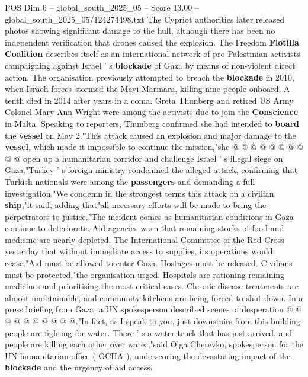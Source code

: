 \begin{textsample}{POS Dim 6 – global\_south\_2025\_05 – Score 13.00 – global\_south\_2025\_05/124274498.txt}
The Cypriot authorities later released photos showing significant damage to the hull, although there has been no independent verification that drones caused the explosion.
The Freedom \textbf{Flotilla} \textbf{Coalition} describes itself as an international network of pro-Palestinian activists campaigning against Israel ' s \textbf{blockade} of Gaza by means of non-violent direct action.
The organisation previously attempted to breach the \textbf{blockade} in 2010, when Israeli forces stormed the Mavi Marmara, killing nine people onboard.
A tenth died in 2014 after years in a coma.
Greta Thunberg and retired US Army Colonel Mary Ann Wright were among the activists due to join the \textbf{Conscience} in Malta.
Speaking to reporters, Thunberg confirmed she had intended to \textbf{board} the \textbf{vessel} on May 2."This attack caused an explosion and major damage to the \textbf{vessel}, which made it impossible to continue the mission,"she @ @ @ @ @ @ @ @ @ @ open up a humanitarian corridor and challenge Israel ' s illegal siege on Gaza."Turkey ' s foreign ministry condemned the alleged attack, confirming that Turkish nationals were among the \textbf{passengers} and demanding a full investigation."We condemn in the strongest terms this attack on a civilian \textbf{ship},"it said, adding that"all necessary efforts will be made to bring the perpetrators to justice."The incident comes as humanitarian conditions in Gaza continue to deteriorate.
Aid agencies warn that remaining stocks of food and medicine are nearly depleted.
The International Committee of the Red Cross yesterday that without immediate access to supplies, its operations would cease."Aid must be allowed to enter Gaza.
Hostages must be released.
Civilians must be protected,"the organisation urged.
Hospitals are rationing remaining medicines and prioritising the most critical cases.
Chronic disease treatments are almost unobtainable, and community kitchens are being forced to shut down.
In a press briefing from Gaza, a UN spokesperson described scenes of desperation @ @ @ @ @ @ @ @ @ @."In fact, as I speak to you, just downstairs from this building people are fighting for water.
There ' s a water truck that has just arrived, and people are killing each other over water,"said Olga Cherevko, spokesperson for the UN humanitarian office ( OCHA ), underscoring the devastating impact of the \textbf{blockade} and the urgency of aid access.

\end{textsample}
